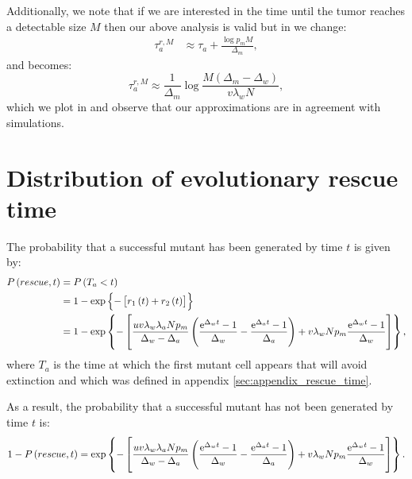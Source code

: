 \documentclass[12pt]{extarticle}
\newcommand{\e}{{\rm e}}
\begin{document}
\begin{appendices}
Additionally, we note that if we are interested in the time until the tumor reaches a detectable size $M$ then our above analysis is valid but in  we change:
\begin{align}\label{meanproliferationtime2}
\tau_a^{r,M}&\approx\tau_a+\frac{\log p_mM}{\Delta_m},
\end{align}
and  becomes:
\begin{equation}\label{eq:t2det2}
\tau_a^{r,M}\approx\frac{1}{\Delta_m}\log\frac{M\left(\Delta_m-\Delta_w\right)}{v\lambda_wN},
\end{equation}
which we plot in  and observe that our approximations are in agreement with simulations.

\section{Distribution of evolutionary rescue time}\label{sec:appendix_distribution_time}
The probability that a successful mutant has been generated by time $t$ is given by:
\begin{align*}
P\left(rescue,t\right)&=P\left(T_a<t\right)\\
&=1-\exp\left\{-\left[r_1\left(t\right)+r_2\left(t\right)\right]\right\}\\
&=1-\exp\left\{-\left[\frac{uv\lambda_w\lambda_aNp_m}{\Delta_w-\Delta_a}\left(\frac{\e^{\Delta_wt}-1}{\Delta_w}-\frac{\e^{\Delta_at}-1}{\Delta_a}\right)+ v\lambda_wNp_m\frac{\e^{\Delta_w t}-1}{\Delta_w}\right]\right\},
\end{align*}
where $T_a$ is the time at which the first mutant cell appears that will avoid extinction and which was defined in appendix \ref{sec:appendix_rescue_time}.

As a result, the probability that a successful mutant has not been generated by time $t$ is:
\begin{equation}
1-P\left(rescue,t\right)=\exp\left\{-\left[\frac{uv\lambda_w\lambda_aNp_m}{\Delta_w-\Delta_a}\left(\frac{\e^{\Delta_wt}-1}{\Delta_w}-\frac{\e^{\Delta_at}-1}{\Delta_a}\right)+ v\lambda_wNp_m\frac{\e^{\Delta_w t}-1}{\Delta_w}\right]\right\}.
\end{equation}

\end{appendices}
\end{document}
